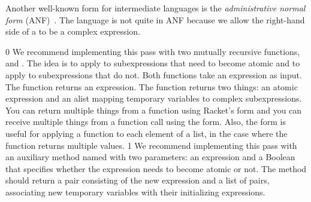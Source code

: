 \documentclass[7x10]{TimesAPriori_MIT}%
\def\racketEd{0}
\def\pythonEd{1}
\def\edition{1}
\begin{document}
Another well-known form for intermediate languages is the
\emph{administrative normal form}
(ANF)~\citep{Danvy:1991fk,Flanagan:1993cg}.
 
%
The \LangVarANF{} language is not quite in ANF because we allow the
right-hand side of a  to be a complex expression.

{\if\edition\racketEd
We recommend implementing this pass with two mutually recursive
functions,  and . The idea is to apply
 to subexpressions that need to become atomic and to
apply  to subexpressions that do not.  Both functions
take an \LangVar{} expression as input.  The  function
returns an expression.  The  function returns two
things: an atomic expression and an alist mapping temporary variables to
complex subexpressions. You can return multiple things from a function
using Racket's  form and you can receive multiple things
from a function call using the  form.
Also, the
\href{https://docs.racket-lang.org/reference/for.html#%28form._%28%28lib._racket%2Fprivate%2Fbase..rkt%29._for%2Flists%29%29}{\code{for/lists}}
  form is useful for applying a function to each element of a list, in
  the case where the function returns multiple values.
\fi}
%
{\if\edition\pythonEd
%
We recommend implementing this pass with an auxiliary method named
 with two parameters: an \LangVar{} expression and a
Boolean that specifies whether the expression needs to become atomic
or not.  The  method should return a pair consisting of
the new expression and a list of pairs, associating new temporary
variables with their initializing expressions.
%
\fi}
\end{document}
